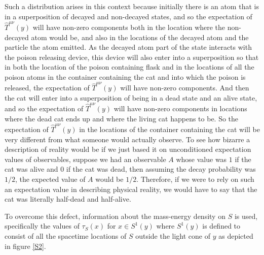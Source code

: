\documentclass[12pt]{report}
\begin{document}
  Such a distribution arises in this context because initially there is an atom that is in a superposition of decayed and non-decayed states, and so the expectation of $\hat{T}^{\mu\nu}(y)$ will have non-zero components both in the location where the non-decayed atom would be, and also in the locations of the decayed atom and the particle the atom emitted. As the decayed atom part of the state interacts with the poison releasing device, this device will also enter into a superposition so that in both the location of the poison containing flask and in the locations of all the poison atoms in the container containing the cat and into which the poison is released, the expectation of $\hat{T}^{\mu\nu}(y)$ will have non-zero components. And then the cat will enter into a superposition of being in a dead state and an alive state, and so  the expectation of $\hat{T}^{\mu\nu}(y)$ will have non-zero components in locations where the dead cat ends up and where the living cat happens to be. So the expectation of $\hat{T}^{\mu\nu}(y)$ in the locations of the container containing the cat will be very different from what someone would actually observe. To see how bizarre a description of reality would be if we just based it on unconditioned expectation values of observables, suppose we had an observable $A$ whose value was $1$ if the cat was alive and $0$ if the cat was dead, then assuming the decay probability was $1/2$, the expected value of $A$ would be $1/2$. Therefore, if we were to rely on such an expectation value in describing physical reality, we would have to say that the cat was literally half-dead and half-alive. 

  To overcome this defect, information about the mass-energy density on $S$ is used, specifically the values of $\tau_S(x)$ for $x\in S^1(y)$ where  $S^1(y)$  %
  is defined to consist of all the spacetime locations of $S$ outside the light cone of $y$ as depicted in figure \ref{S2}.  
\end{document}
